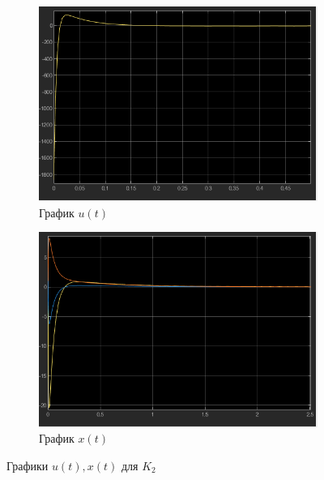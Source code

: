 \documentclass[a4paper, 12pt]{article}
\begin{document}
    \begin{figure}[H]
        \centering
        \begin{subfigure}{0.45\textwidth}
            \centering
            \includegraphics[width=\linewidth]{u_t_k2_task1.png}
            \caption{График $u(t)$}
            \label{fig:task_1_u_t_k2}
        \end{subfigure}
        \hfill
        \begin{subfigure}{0.45\textwidth}
            \centering
            \includegraphics[width=\linewidth]{x_t_k2_task1.png}
            \caption{График $x(t)$}
            \label{fig:task_1_x_t_k2}
        \end{subfigure}
        \caption{Графики $u(t),x(t)$ для $K_2$}
        \label{fig:task_1_modeling_2}
    \end{figure}
\end{document}
